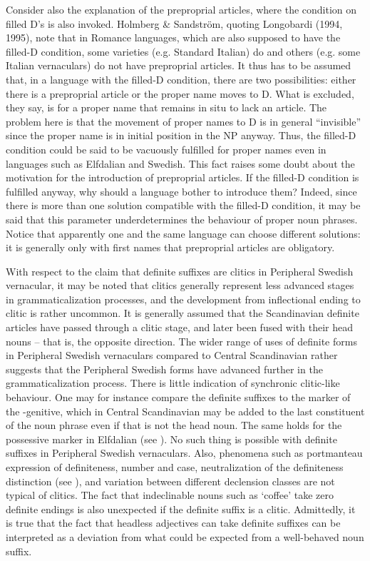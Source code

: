 Consider also the explanation of the preproprial articles, where the condition on filled D’s is also invoked. Holmberg \& Sandström, quoting Longobardi (1994, 1995), note that in Romance languages, which are also supposed to have the filled-D condition, some varieties (e.g. Standard Italian) do and others (e.g. some Italian vernaculars) do not have preproprial articles. It thus has to be assumed that, in a language with the filled-D condition, there are two possibilities: either there is a preproprial article or the proper name moves to D. What is excluded, they say, is for a proper name that remains in situ to lack an article. The problem here is that the movement of proper names to D is in general “invisible” since the proper name is in initial position in the NP anyway. Thus, the filled-D condition could be said to be vacuously fulfilled for proper names even in languages such as Elfdalian and Swedish. This fact raises some doubt about the motivation for the introduction of preproprial articles. If the filled-D condition is fulfilled anyway, why should a language bother to introduce them? Indeed, since there is more than one solution compatible with the filled-D condition, it may be said that this parameter underdetermines the behaviour of proper noun phrases. Notice that apparently one and the same language can choose different solutions: it is generally only with first names that preproprial articles are obligatory. 

With respect to the claim that definite suffixes are clitics in Peripheral Swedish vernacular, it may be noted that clitics generally represent less advanced stages in grammaticalization processes, and the development from inflectional ending to clitic is rather uncommon. It is generally assumed that the Scandinavian definite articles have passed through a clitic stage, and later been fused with their head nouns – that is, the opposite direction. The wider range of uses of definite forms in Peripheral Swedish vernaculars compared to Central Scandinavian rather suggests that the Peripheral Swedish forms have advanced further in the grammaticalization process. There is little indication of synchronic clitic-like behaviour. One may for instance compare the definite suffixes to the marker of the -genitive, which in Central Scandinavian may be added to the last constituent of the noun phrase even if that is not the head noun. The same holds for the possessive marker  in Elfdalian (see ). No such thing is possible with definite suffixes in Peripheral Swedish vernaculars. Also, phenomena such as portmanteau expression of definiteness, number and case, neutralization of the definiteness distinction (see ), and variation between different declension classes are not typical of clitics. The fact that indeclinable nouns such as  ‘coffee’ take zero definite endings is also unexpected if the definite suffix is a clitic. Admittedly, it is true that the fact that headless adjectives can take definite suffixes can be interpreted as a deviation from what could be expected from a well-behaved noun suffix.

